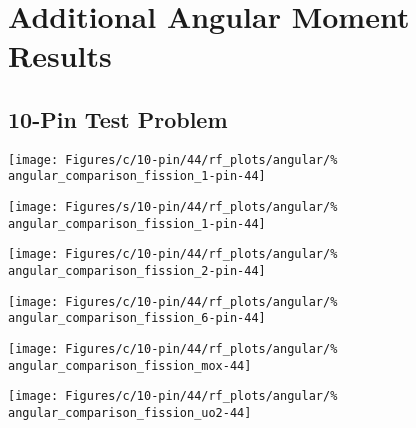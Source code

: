 
\chapter{Additional Angular Moment Results} %

\label{AppendixB} 


\section{10-Pin Test Problem}

\begin{figure*}[tbph]
    \centering
    \texttt{[image: Figures/c/10-pin/44/rf\_plots/angular/\%
        angular\_comparison\_fission\_1-pin-44]}
\end{figure*}

\begin{figure*}[tbph]
    \centering
    \texttt{[image: Figures/s/10-pin/44/rf\_plots/angular/\%
        angular\_comparison\_fission\_1-pin-44]}
\end{figure*}

\begin{figure*}[tbph]
    \centering
    \texttt{[image: Figures/c/10-pin/44/rf\_plots/angular/\%
        angular\_comparison\_fission\_2-pin-44]}
\end{figure*}

\begin{figure*}[tbph]
    \centering
    \texttt{[image: Figures/c/10-pin/44/rf\_plots/angular/\%
        angular\_comparison\_fission\_6-pin-44]}
\end{figure*}

\begin{figure*}[tbph]
    \centering
    \texttt{[image: Figures/c/10-pin/44/rf\_plots/angular/\%
        angular\_comparison\_fission\_mox-44]}
\end{figure*}

\begin{figure*}[tbph]
    \centering
    \texttt{[image: Figures/c/10-pin/44/rf\_plots/angular/\%
        angular\_comparison\_fission\_uo2-44]}
\end{figure*}

